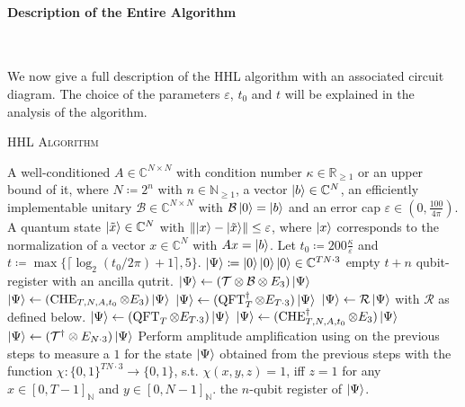 \paragraph*{Description of the Entire Algorithm} \phantom{}\\\phantom{}

We now give a full description of the HHL algorithm with an associated circuit diagram. The choice of the parameters \(\varepsilon\), \(t_0\) and \(t\) will be explained in the analysis of the algorithm.

{\centering\begin{minipage}{\linewidth}
    \vspace{-0.25cm}
    \begin{algorithm}[H]
        \caption{\textsc{HHL Algorithm}}
        \label{hhl_algorithm}
        \begin{algorithmic}[1]
            \Require A well-conditioned \(A \in \mathbb{C}^{N \times N}\) with condition number \(\kappa \in \mathbb{R}_{\geq 1}\) or an upper bound of it, where \(N \coloneqq 2^n\) with \(n \in \mathbb{N}_{\geq 1}\), a vector \(\ket{b} \in \mathbb{C}^N\), an efficiently implementable unitary \(\mathcal{B} \in \mathbb{C}^{N \times N}\) with \(\mathcal{B}\ket{0} = \ket{b}\) and an error cap \(\varepsilon \in \left(0, \frac{100}{4\pi}\right)\).
            \Ensure A quantum state \(\ket{\tilde{x}} \in \mathbb{C}^N\) with \(\norm{\ket{x}-\ket{\tilde{x}}} \leq \varepsilon\), where \(\ket{x}\) corresponds to the normalization of a vector \(x \in \mathbb{C}^N\) with \(Ax=\ket{b}\).
            \State Let \(t_0 \coloneqq 200\frac{\kappa}{\varepsilon}\) and \(t \coloneqq \max\{\lceil \log_2(t_0/2\pi) + 1 \rceil, 5\}\).
            \State \(\ket{\Psi} \coloneqq \ket{0}\ket{0}\ket{0} \in \mathbb{C}^{TN \cdot 3}\) empty \(t+n\) qubit-register with an ancilla qutrit.
            \State \(\ket{\Psi} \gets (\mathcal{T} \otimes \mathcal{B} \otimes E_3)\ket{\Psi}\)
            \State \(\ket{\Psi} \gets (\operatorname{CHE}_{T, N, A, t_0} \otimes E_3)\ket{\Psi}\)
            \State \(\ket{\Psi} \gets (\operatorname{QFT}^\dagger_T \otimes E_{T \cdot 3}) \ket{\Psi}\)
            \State \(\ket{\Psi} \gets \mathcal{R}\ket{\Psi}\) with \(\mathcal{R}\) as defined below.
            \State \(\ket{\Psi} \gets (\operatorname{QFT}_T \otimes E_{T \cdot 3})\ket{\Psi}\)
            \State \(\ket{\Psi} \gets (\operatorname{CHE}^\dagger_{T, N, A, t_0} \otimes E_3)\ket{\Psi}\)
            \State \(\ket{\Psi} \gets (\mathcal{T}^\dagger \otimes E_{N \cdot 3})\ket{\Psi}\)
            \State Perform amplitude amplification using  on the previous steps to measure a \(1\) for the state \(\ket{\Psi}\) obtained from the previous steps with the function \(\chi\colon \{0, 1\}^{TN \cdot 3} \to \{0, 1\}\), s.t. \(\chi(x, y, z) = 1\), iff \(z = 1\) for any \(x \in [0, T-1]_{\mathbb{N}}\) and \(y \in [0, N-1]_{\mathbb{N}}\).
            \State \Return the \(n\)-qubit register of \(\ket{\Psi}\).
        \end{algorithmic}
    \end{algorithm}
\end{minipage}\par}

